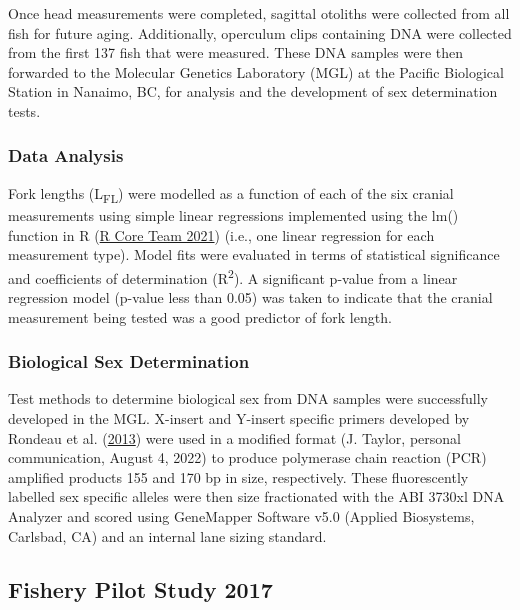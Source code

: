 \documentclass[12pt]{article}\usepackage[]{graphicx}\usepackage[]{color}
\begin{document}
Once head measurements were completed, sagittal otoliths were collected from all fish for future aging. Additionally, operculum clips containing DNA were collected from the first 137 fish that were measured. These DNA samples were then forwarded to the Molecular Genetics Laboratory (MGL) at the Pacific Biological Station in Nanaimo, BC, for analysis and the development of sex determination tests.

\hypertarget{data-analysis}{%
\subsubsection{Data Analysis}\label{data-analysis}}

Fork lengths (L\textsubscript{FL}) were modelled as a function of each of the six cranial measurements using simple linear regressions implemented using the lm() function in R (\protect\hyperlink{ref-R}{R Core Team 2021}) (i.e., one linear regression for each measurement type). Model fits were evaluated in terms of statistical significance and coefficients of determination (R\textsuperscript{2}). A significant p-value from a linear regression model (p-value less than 0.05) was taken to indicate that the cranial measurement being tested was a good predictor of fork length.

\hypertarget{biological-sex-determination}{%
\subsubsection{Biological Sex Determination}\label{biological-sex-determination}}

Test methods to determine biological sex from DNA samples were successfully developed in the MGL. X-insert and Y-insert specific primers developed by Rondeau et al. (\protect\hyperlink{ref-Rondeau2013}{2013}) were used in a modified format (J. Taylor, personal communication, August 4, 2022) to produce polymerase chain reaction (PCR) amplified products 155 and 170 bp in size, respectively. These fluorescently labelled sex specific alleles were then size fractionated with the ABI 3730xl DNA Analyzer and scored using GeneMapper Software v5.0 (Applied Biosystems, Carlsbad, CA) and an internal lane sizing standard.

\hypertarget{fishery-pilot-study-2017}{%
\subsection{Fishery Pilot Study 2017}\label{fishery-pilot-study-2017}}
\end{document}
